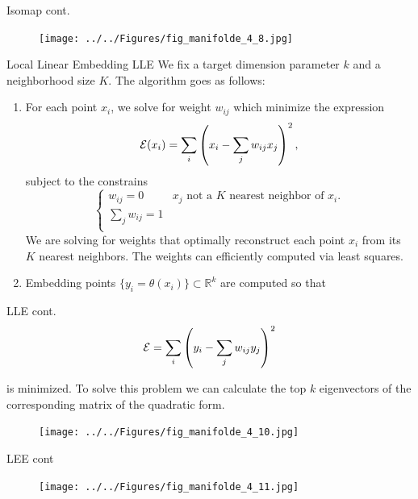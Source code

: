 \documentclass{beamer}
\begin{document}
\begin{frame}{Isomap cont.}
		\begin{figure}[h]
		\centering
		\texttt{[image: ../../Figures/fig\_manifolde\_4\_8.jpg]}
	\end{figure}	
\end{frame}

\begin{frame}{Local Linear Embedding LLE}
	We fix a target dimension parameter $k$ and a neighborhood size $K$. The algorithm goes as follows:
	\begin{enumerate}
		\item For each point $x_i$, we solve for weight $w_{ij}$ which minimize the expression
		\begin{equation*}
			{\cal E}(x_i)= \sum_i \left( x_i - \sum_j w_{ij} x_j \right)^2, 
		\end{equation*}
		subject to the constrains
		\begin{equation*}
			\begin{cases}
				w_{ij}=0 & \text{$x_j$ not a $K$ nearest neighbor of $x_i$}.\\
				\sum_j w_{ij}=1 & \\
			\end{cases}
		\end{equation*}
	We are solving for weights that optimally reconstruct each point $x_i$ from its $K$ nearest neighbors. The weights can efficiently computed via least squares.
	\item Embedding points $\{ y_i = \theta(x_i)\} \subset \mathbb{R}^k$ are computed so that

	\end{enumerate}
\end{frame}

\begin{frame}{LLE cont.}
		\begin{equation*}
		{\cal E}= \sum_i \left( y_i - \sum_j w_{ij}y_j \right)^2
	\end{equation*}

		is minimized. To solve this problem we can calculate the top $k$ eigenvectors of the corresponding matrix of the quadratic form. 
	\begin{figure}[h]
	\centering
	\texttt{[image: ../../Figures/fig\_manifolde\_4\_10.jpg]}
\end{figure}			
		
\end{frame}

\begin{frame}{LEE cont}
		\begin{figure}[h]
		\centering
		\texttt{[image: ../../Figures/fig\_manifolde\_4\_11.jpg]}
	\end{figure}			
\end{frame}
\end{document}
